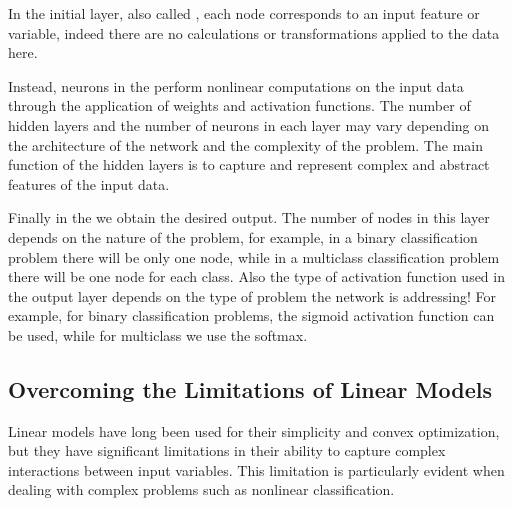 In the initial layer, also called \textbf{\color{green!60!black}{Input Layer}}, each node corresponds to an input feature or variable, indeed there are no calculations or transformations applied to the data here.

Instead, neurons in the \textbf{\color{mybluee}{Hidden Layers}} perform nonlinear computations on the input data through the application of weights and activation functions.
The number of hidden layers and the number of neurons in each layer may vary depending on the architecture of the network and the complexity of the problem.
The main function of the hidden layers is to capture and represent complex and abstract features of the input data.

Finally in the \textbf{\color{red!80!black}{Output Layer}} we obtain the desired output.
The number of nodes in this layer depends on the nature of the problem, for example, in a binary classification problem there will be only one node, while in a multiclass classification problem there will be one node for each class.
Also the type of activation function used in the output layer depends on the type of problem the network is addressing! For example, for binary classification problems, the sigmoid activation function can be used, while for multiclass we use the softmax.

\subsection{Overcoming the Limitations of Linear Models}

Linear models have long been used for their simplicity and convex optimization, but they have significant limitations in their ability to capture complex interactions between input variables. This limitation is particularly evident when dealing with complex problems such as nonlinear classification.

